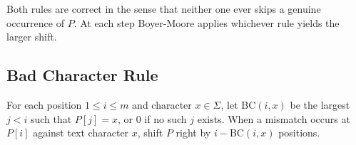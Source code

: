 Both rules are correct in the sense that neither one ever skips a genuine
occurrence of $P$.
At each step Boyer-Moore applies whichever rule yields the larger shift.

\subsection{Bad Character Rule}

\begin{definition}
  For each position $1 \le i \le m$ and character $x \in \Sigma$, let
  $\mathrm{BC}(i,x)$ be the largest $j < i$ such that $P[j] = x$, or $0$
  if no such $j$ exists.
  When a mismatch occurs at $P[i]$ against text character $x$, shift $P$
  right by $i - \mathrm{BC}(i,x)$ positions.
\end{definition}

